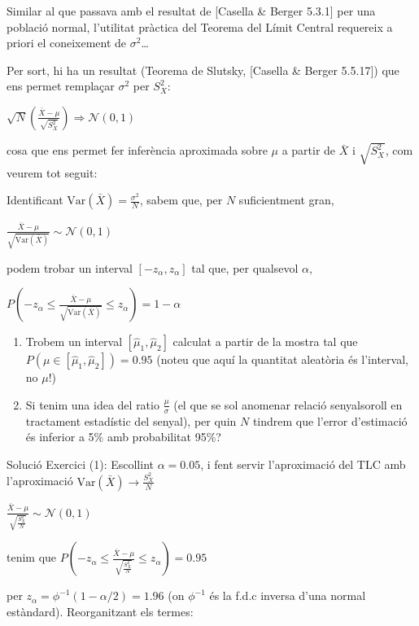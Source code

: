 \documentclass[letterpaper,10pt,english]{sphinxmanual}
\begin{document}
Similar al que passava amb el resultat de {[}Casella \& Berger 5.3.1{]} per una població normal,
l’utilitat pràctica del Teorema del Límit Central requereix a priori el coneixement
de \(\sigma^2\)…

Per sort, hi ha un resultat (Teorema de Slutsky, {[}Casella \& Berger 5.5.17{]}) que ens permet
remplaçar \(\sigma^2\) per \(S^2_X\):

\(\sqrt{N}\left(\frac{\bar{X} - \mu}{\sqrt{S^2_X}}\right) \Rightarrow \mathcal{N}(0, 1)\)

cosa que ens permet fer inferència aproximada sobre \(\mu\)
a partir de \(\bar{X}\) i \(\sqrt{S^2_X}\), com veurem tot seguit:

Identificant \(\mbox{Var}(\bar{X}) = \frac{\sigma^2}{N}\), sabem que, per \(N\) suficientment gran,

\(\frac{\bar{X} - \mu}{\sqrt{\mbox{Var}(\bar{X})}} \sim \mathcal{N}(0, 1)\)

podem trobar un interval \([-z_{\alpha}, z_{\alpha}]\) tal que, per qualsevol \(\alpha\),

\(P(-z_{\alpha} \leq \frac{\bar{X} - \mu}{\sqrt{\mbox{Var}(\bar{X})}} \leq z_{\alpha}) = 1 - \alpha\)

\begin{enumerate}
%
\item {} 
Trobem un interval  \([\hat{\mu}_1, \hat{\mu}_2]\) calculat a partir de la mostra tal que \(P(\mu \in [\hat{\mu}_1, \hat{\mu}_2]) = 0.95\) (noteu que aquí la quantitat aleatòria és l’interval, no \(\mu\)!)

\item {} 
Si tenim una idea del ratio \(\frac{\mu}{\sigma}\) (el que se sol anomenar relació senyal\sphinxhyphen{}soroll en tractament estadístic del senyal), per quin \(N\) tindrem que l’error d’estimació és inferior a 5\% amb probabilitat 95\%?

\end{enumerate}

Solució Exercici (1):  Escollint \(\alpha=0.05\), i fent servir
l’aproximació del TLC amb l’aproximació \(\mbox{Var}\left(\bar{X}\right) \to \frac{S^2_X}{N}\)

\(\frac{\bar{X} - \mu}{\sqrt{\frac{S^2_X}{N}}} \sim \mathcal{N}(0, 1)\)

tenim que \(P(-z_{\alpha} \leq \frac{\bar{X} - \mu}{\sqrt{\frac{S^2_X}{N}}} \leq z_{\alpha}) = 0.95\)

per \(z_{\alpha} = \phi^{-1}\left(1 - \alpha/2\right) = 1.96\) (on \(\phi^{-1}\) és la
f.d.c inversa d’una normal estàndard). Re\sphinxhyphen{}organitzant els termes:
\end{document}
